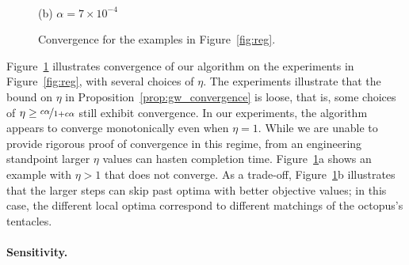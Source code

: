 \begin{figure}[t]
\\\vspace{-.05in}
(b) $\alpha=7\times10^{-4}$
\vspace{-.1in}
\caption{Convergence for the examples in Figure~\ref{fig:reg}.\vspace{-.15in}}\label{fig:convergence}
\end{figure}



Figure~\ref{fig:convergence} illustrates convergence of our algorithm on the experiments in Figure~\ref{fig:reg}, with several choices of $\eta$.  The experiments illustrate that the bound on $\eta$ in Proposition~\ref{prop:gw_convergence} is loose, that is, some choices of $\eta\geq\nicefrac{c\alpha}{1+c\alpha}$ still exhibit convergence.  In our experiments, the algorithm appears to converge monotonically even when $\eta=1$.  While we are unable to provide rigorous proof of convergence in this regime, from an engineering standpoint larger $\eta$ values can hasten completion time. Figure~\ref{fig:convergence}a shows an example with $\eta>1$ that does not converge.  As a trade-off, Figure~\ref{fig:convergence}b illustrates that the larger steps can skip past optima with better objective values; in this case, the different local optima correspond to different matchings of the octopus's tentacles.

\paragraph*{Sensitivity.}  

